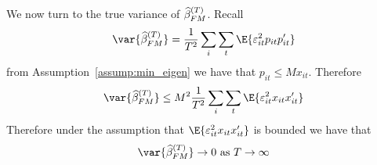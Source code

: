 \begin{solution}
\begin{enumerate}[label = (\alph*)]
    We now turn to the true variance of \(\widehat{\beta}^{(T)}_{FM}\). Recall
    \[
        \var{\wh\beta^{(T)}_{FM}} = \frac{1}{T^2}\sum_i\sum_t\E{\varepsilon_{it}^2p_{it}p_{it}^\prime}
    \]
    from Assumption~\ref{assump:min_eigen} we have that \(p_{it} \leq Mx_{it}\). Therefore
    \begin{align*}
        \var{\wh\beta^{(T)}_{FM}}  \leq M^2\frac{1}{T^2}\sum_i\sum_t\E{\varepsilon_{it}^2x_{it}x_{it}^\prime}
    \end{align*}
    Therefore under the assumption that \(\E{\varepsilon_{it}^2 x_{it}x_{it}^\prime}\) is bounded we have that 
    \[
        \var{\wh\beta^{(T)}_{FM}} \to 0 \text{ as } T \to \infty
    \]
\end{enumerate}
\end{solution}
